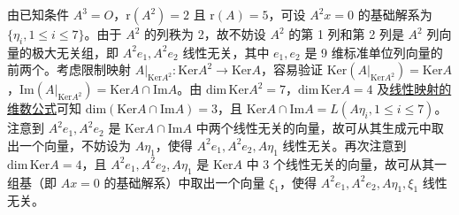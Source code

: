 \documentclass[../../main.tex]{subfiles}%
\begin{document}
\begin{solution}

由已知条件 $A^3 = O$，$\mathrm{r}(A^2) = 2$ 且 $\mathrm{r}(A) = 5$，可设 $A^2x = 0$ 的基础解系为 $\{\eta_i,1 \leqslant  i \leqslant  7\}$。由于 $A^2$ 的列秩为 2，故不妨设 $A^2$ 的第 1 列和第 2 列是 $A^2$ 列向量的极大无关组，即 $A^2e_1,A^2e_2$ 线性无关，其中 $e_1,e_2$ 是 9 维标准单位列向量的前两个。考虑限制映射 $A|_{\mathrm{Ker} A^2}:\mathrm{Ker} A^2 \to \mathrm{Ker} A$，容易验证 $\mathrm{Ker}(A|_{\mathrm{Ker} A^2}) = \mathrm{Ker} A$，$\mathrm{Im}(A|_{\mathrm{Ker} A^2}) = \mathrm{Ker} A \cap \mathrm{Im} A$。由 $\mathrm{dim}\,\mathrm{Ker} A^2 = 7$，$\mathrm{dim}\,\mathrm{Ker} A = 4$ 及\hyperref[theorem:值域和核空间维数之和等于原像空间维数]{线性映射的维数公式}可知 $\mathrm{dim}(\mathrm{Ker} A \cap \mathrm{Im} A) = 3$，且 $\mathrm{Ker} A \cap \mathrm{Im} A = L(A\eta_i,1 \leqslant  i \leqslant  7)$。注意到 $A^2e_1,A^2e_2$ 是 $\mathrm{Ker} A \cap \mathrm{Im} A$ 中两个线性无关的向量，故可从其生成元中取出一个向量，不妨设为 $A\eta_1$，使得 $A^2e_1,A^2e_2,A\eta_1$ 线性无关。再次注意到 $\mathrm{dim}\,\mathrm{Ker} A = 4$，且 $A^2e_1,A^2e_2,A\eta_1$ 是 $\mathrm{Ker} A$ 中 3 个线性无关的向量，故可从其一组基（即 $Ax = 0$ 的基础解系）中取出一个向量 $\xi_1$，使得 $A^2e_1,A^2e_2,A\eta_1,\xi_1$ 线性无关。


\end{solution}
\end{document}
